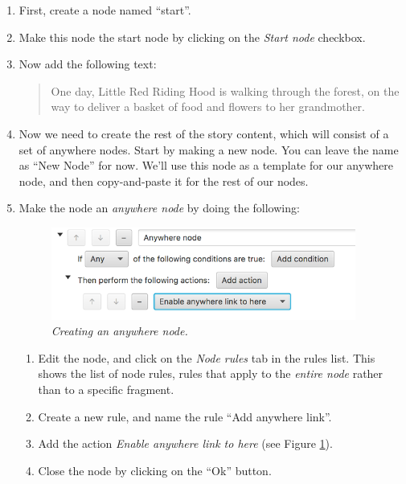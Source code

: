 \documentclass{article}
\begin{document}
\begin{enumerate}
  \item First, create a node named ``start''.
  \item Make this node the start node by clicking on the \textit{Start node} checkbox.
  \item Now add the following text:

\begin{quotation}
\noindent One day, Little Red Riding Hood is walking through the forest, on the way to deliver a basket of food and flowers to her grandmother. 
\end{quotation}

\item Now we need to create the rest of the story content, which will consist of a set of anywhere nodes. Start by making a new node. You can leave the name as ``New Node'' for now. We'll use this node as a template for our anywhere node, and then copy-and-paste it for the rest of our nodes.
\item Make the node an \textit{anywhere node} by doing the following:
\begin{figure}[h]
  \centering
  \includegraphics[width=10cm]{images/hypedyn-tutorial-2-figure-9}
  \caption{\textit{Creating an anywhere node.}}
  \label{fig:tut2:anywherenode}
\end{figure} 

\begin{enumerate}
\item Edit the node, and click on the \textit{Node rules} tab in the rules list. This shows the list of node rules, rules that apply to the \textit{entire node} rather than to a specific fragment.
  \item Create a new rule, and name the rule ``Add anywhere link''.
  \item Add the action \textit{Enable anywhere link to here} (see Figure \ref{fig:tut2:anywherenode}).
\item Close the node by clicking on the ``Ok'' button.
\end{enumerate}


\end{enumerate}
\end{document}
